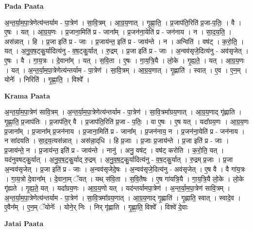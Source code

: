 \documentclass[17pt]{extarticle}
\begin{document}
\textbf{Pada Paata} \newline

अ॒न्त॒र्या॒म॒पा॒त्रेणेत्य॑न्तर्याम - पा॒त्रेण॑ । सा॒वि॒त्रम् । आ॒ग्र॒य॒णात् । गृ॒ह्णा॒ति॒ । प्र॒जाप॑ति॒रिति॑ प्र॒जा-प॒तिः॒ । वै । ए॒षः । यत् । आ॒ग्र॒य॒णः । प्र॒जाना॒मिति॑ प्र - जाना᳚म् । प्र॒जन॑ना॒येति॑ प्र - जन॑नाय । न । सा॒द॒य॒ति॒ । अस॑न्नात् । हि । प्र॒जा इति॑ प्र - जाः । प्र॒जाय॑न्त॒ इति॑ प्र - जाय॑न्ते । न । अन्विति॑ । वष॑ट् । क॒रो॒ति॒ । यत् । अ॒नु॒व॒ष॒ट्कु॒र्यादित्य॑नु - व॒ष॒ट्कु॒र्यात् । रु॒द्रम् । प्र॒जा इति॑ प्र - जाः । अ॒न्वव॑सृजे॒दित्य॑नु - अव॑सृजेत् । ए॒षः । वै । गा॒य॒त्रः । दे॒वाना᳚म् । यत् । स॒वि॒ता । ए॒षः । गा॒य॒त्रि॒यै । लो॒के । गृ॒ह्य॒ते॒ । यत् । आ॒ग्र॒य॒णः । यत् । अ॒न्त॒र्या॒म॒पा॒त्रेणेत्य॑न्तर्याम - पा॒त्रेण॑ । सा॒वि॒त्रम् । आ॒ग्र॒य॒णात् । गृ॒ह्णाति॑ । स्वात् । ए॒व । ए॒न॒म् । योनेः᳚ । निरिति॑ । गृ॒ह्णा॒ति॒ । विश्वे᳚ ।  \newline


\textbf{Krama Paata} \newline

अ॒न्त॒र्या॒म॒पा॒त्रेण॑ सावि॒त्रम् । अ॒न्त॒र्या॒म॒पा॒त्रेणेत्य॑न्तर्याम - पा॒त्रेण॑ । सा॒वि॒त्रमा᳚ग्रय॒णात् । आ॒ग्र॒य॒णाद् गृ॑ह्णाति । गृ॒ह्णा॒ति॒ प्र॒जाप॑तिः । प्र॒जाप॑ति॒र् वै । प्र॒जाप॑ति॒रिति॑ प्र॒जा - प॒तिः॒ । वा ए॒षः । ए॒ष यत् । यदा᳚ग्रय॒णः । आ॒ग्र॒य॒णः प्र॒जाना᳚म् । प्र॒जाना᳚म् प्र॒जन॑नाय । प्र॒जाना॒मिति॑ प्र - जाना᳚म् । प्र॒जन॑नाय॒ न । प्र॒जन॑ना॒येति॑ प्र - जन॑नाय । न सा॑दयति । सा॒द॒य॒त्यस॑न्नात् । अस॑न्ना॒द्‌धि । हि प्र॒जाः । प्र॒जाः प्र॒जाय॑न्ते । प्र॒जा इति॑ प्र - जाः । प्र॒जाय॑न्ते॒ न । प्र॒जाय॑न्त॒ इति॑ प्र - जाय॑न्ते । नानु॑ । अनु॒ वष॑ट् । वष॑ट् करोति । क॒रो॒ति॒ यत् । यद॑नुवषट्कु॒र्यात् । अ॒नु॒व॒ष॒ट्॒कु॒र्याद् रु॒द्रम् । अ॒नु॒व॒ष॒ट्॒कु॒र्यादित्य॑नु - व॒ष॒ट्कु॒र्यात् । रु॒द्रम् प्र॒जाः । प्र॒जा अ॒न्वव॑सृजेत् । प्र॒जा इति॑ प्र - जाः । अ॒न्वव॑सृजेदे॒षः । अ॒न्वव॑सृजे॒दित्य॑नु - अव॑सृजेत् । ए॒ष वै । वै गा॑य॒त्रः । गा॒य॒त्रो दे॒वाना᳚म् । दे॒वाना॒म् ॅयत् । यथ् स॑वि॒ता । स॒वि॒तैषः । ए॒ष गा॑यत्रि॒यै । गा॒य॒त्रि॒यै लो॒के । लो॒के गृ॑ह्यते । गृ॒ह्य॒ते॒ यत् । यदा᳚ग्रय॒णः । आ॒ग्र॒य॒णो यत् । यद॑न्तर्यामपा॒त्रेण॑ । अ॒न्त॒र्या॒म॒पा॒त्रेण॑ सावि॒त्रम् । अ॒न्त॒र्या॒म॒पा॒त्रेणेत्य॑न्तर्याम - पा॒त्रेण॑ । सा॒वि॒त्रमा᳚ग्रय॒णात् । आ॒ग्र॒य॒णाद् गृ॒ह्णाति॑ । गृ॒ह्णाति॒ स्वात् । स्वादे॒व । ए॒वैन᳚म् । ए॒न॒म् ॅयोनेः᳚ । योने॒र् निः । निर् गृ॑ह्णाति । गृ॒ह्णा॒ति॒ विश्वे᳚ । विश्वे॑ दे॒वाः \newline

\textbf{Jatai Paata} \newline
\end{document}
